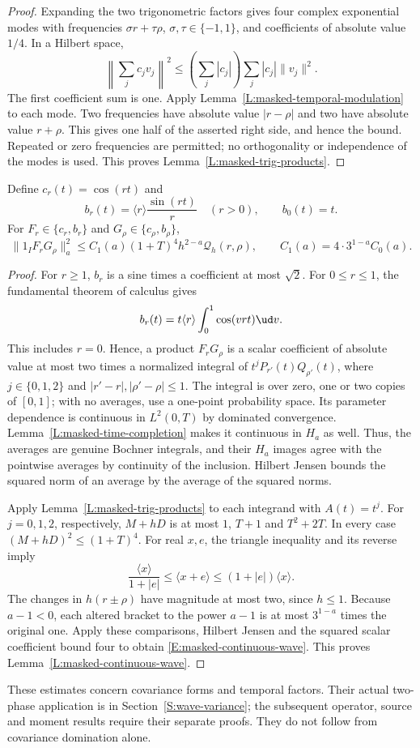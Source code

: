 \begin{proof}
  Expanding the two trigonometric factors gives four complex exponential
  modes with frequencies $\sigma r+\tau\rho$, $\sigma,\tau \in \{-1,1\}$,
  and coefficients of absolute value $1/4$. In a Hilbert space,
  \[
    \left\|\sum_j c_jv_j\right\|^2
    \le \left(\sum_j|c_j|\right)\sum_j|c_j|\|v_j\|^2.
  \]
  The first coefficient sum is one. Apply
  Lemma~\ref{L:masked-temporal-modulation} to each mode. Two frequencies
  have absolute value $|r-\rho|$ and two have absolute value $r+\rho$.
  This gives one half of the asserted right side, and hence the bound.
  Repeated or zero frequencies are permitted; no orthogonality or
  independence of the modes is used.
  This proves Lemma~\ref{L:masked-trig-products}.
\end{proof}

\begin{lemma}\label{L:masked-continuous-wave}
  Define $c_r(t) = \cos(rt)$ and
  \[
    b_r(t) = \langle r\rangle\frac{\sin(rt)}r\quad(r > 0),
    \qquad b_0(t) = t.
  \]
  For $F_r \in \{c_r,b_r\}$ and $G_\rho \in \{c_\rho,b_\rho\}$,
  \begin{equation}\label{E:masked-continuous-wave}
    \|1_IF_rG_\rho\|_a^2
    \le C_1(a)(1+T)^4h^{2-a}\mathcal Q_h(r,\rho),
    \qquad C_1(a) = 4\cdot3^{1-a}C_0(a).
  \end{equation}
\end{lemma}

\begin{proof}
  For $r \ge 1$, $b_r$ is a sine times a coefficient at most $\sqrt{2}$.
  For $0 \le r \le 1$, the fundamental theorem of calculus gives
  \[
    b_r(t) = t\langle r\rangle\int_0^1\cos(vrt)\ud v.
  \]
  This includes $r = 0$. Hence, a product $F_rG_\rho$ is a scalar
  coefficient of absolute value at most two times a normalized integral
  of $t^jP_{r'}(t)Q_{\rho'}(t)$, where $j \in \{0,1,2\}$ and
  $|r'-r|,|\rho'-\rho| \le 1$. The integral is over zero, one or two
  copies of $[0,1]$; with no averages, use a one-point probability space.
  Its parameter dependence is continuous in $L^2(0,T)$ by dominated
  convergence. Lemma~\ref{L:masked-time-completion} makes it continuous
  in $H_a$ as well. Thus, the averages are genuine Bochner integrals,
  and their $H_a$ images agree with the pointwise averages by continuity
  of the inclusion. Hilbert Jensen bounds the squared norm of an average
  by the average of the squared norms.

  Apply Lemma~\ref{L:masked-trig-products} to each integrand with $A(t)=t^j$.
  For $j = 0,1,2$, respectively, $M+hD$ is at most
  $1$, $T+1$ and $T^2+2T$. In every case $(M+hD)^2 \le (1+T)^4$.
  For real $x,e$, the triangle inequality and its reverse imply
  \[
    \frac{\langle x\rangle}{1+|e|}
    \le \langle x+e\rangle \le (1+|e|)\langle x\rangle.
  \]
  The changes in $h(r\pm\rho)$ have magnitude at most two, since $h \le 1$.
  Because $a-1 < 0$, each altered bracket to the power $a-1$ is at most
  $3^{1-a}$ times the original one. Apply these comparisons, Hilbert Jensen
  and the squared scalar coefficient bound four to obtain
  \eqref{E:masked-continuous-wave}.
  This proves Lemma~\ref{L:masked-continuous-wave}.
\end{proof}

These estimates concern covariance forms and temporal factors.
Their actual two-phase application is in Section~\ref{S:wave-variance};
the subsequent operator, source and moment results require their
separate proofs. They do not follow from covariance domination alone.
